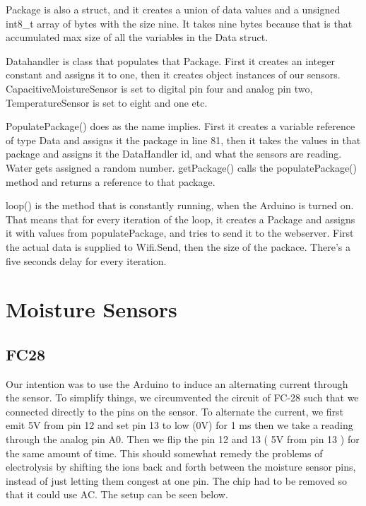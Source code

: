 \documentclass[a4paper,12pt,oneside,openright,titlepage]{book}
\begin{document}
Package is also a struct, and it creates a union of data values and a unsigned int8\_t array of bytes with the size nine. It takes nine bytes because that is that accumulated max size of all the variables in the Data struct.

Datahandler is class that populates that Package. First it creates an integer constant and assigns it to one, then it creates object instances of our sensors. CapacitiveMoistureSensor is set to digital pin four and analog pin two, TemperatureSensor is set to eight and one etc. 

PopulatePackage() does as the name implies. First it creates a variable reference of type Data and assigns it the package in line 81, then it takes the values in that package and assigns it the DataHandler id, and what the sensors are reading. Water gets assigned a random number. getPackage() calls the populatePackage() method and returns a reference to that package.

loop() is the method that is constantly running, when the Arduino is turned on. That means that for every iteration of the loop, it creates a Package and assigns it with values from populatePackage, and tries to send it to the webserver. First the actual data is supplied to Wifi.Send, then the size of the packace. There's a five seconds delay for every iteration.

\section{Moisture Sensors}
\subsection{FC28}
Our intention was to use the Arduino to induce an alternating current through the sensor. To simplify things, we circumvented the circuit of FC-28 such that we connected directly to the pins on the sensor. To alternate the current, we first emit 5V from pin 12 and set pin 13 to low (0V) for 1 ms then we take a reading through the analog pin A0. Then we flip the pin 12 and 13 ( 5V from pin 13 ) for the same amount of time. This should somewhat remedy the problems of electrolysis by shifting the ions back and forth between the moisture sensor pins, instead of just letting them congest at one pin. The chip had to be removed so that it could use AC.
The setup can be seen below.
\end{document}
